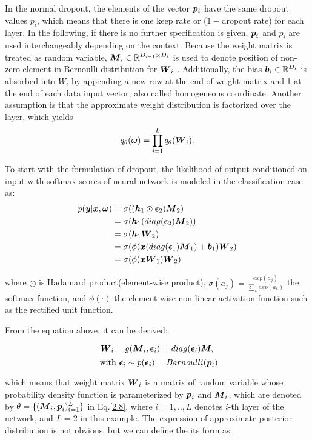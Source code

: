 In the normal dropout, the elements of the vector $\boldsymbol p_{i}$ have the same dropout values $p_{i}$, which means that there is one keep rate or ($1-$dropout rate) for each layer. In the following, if there is no further specification is given, $\boldsymbol p_{i}$ and $p_{i}$ are used interchangeably depending on the context. Because the weight matrix is treated as random variable, $\boldsymbol M_{i} \in \mathbb R^{D_{i-1} \times D_{i}}$ is used to denote position of non-zero element in Bernoulli distribution for $\boldsymbol W_{i}$ %
. Additionally, the bias $\boldsymbol b_{i} \in \mathbb R^{D_{i}}$ is absorbed into $W_{i}$ by appending a new row at the end of weight matrix and 1 at the end of each data input vector, also called homogeneous coordinate. Another assumption is that the approximate weight distribution is factorized over the layer, which yields
\[
q_{\theta}(\boldsymbol \omega) = \prod_{i=1}^{L}q_{\theta}(\boldsymbol W_{i}). 
\]

To start with the formulation of dropout, the likelihood of output conditioned on input with softmax scores of neural network is modeled in the classification case as:
\begin{equation}
\begin{aligned} \label{dropout_form}
p(\boldsymbol y| \boldsymbol x, \boldsymbol \omega) & = \sigma((\boldsymbol h_{1} \odot \boldsymbol \epsilon_{2}) \boldsymbol M_{2})\\
& = \sigma(\boldsymbol h_{1} (diag(\boldsymbol \epsilon_{2}) \boldsymbol M_{2})) \\
& = \sigma(\boldsymbol h_{1} \boldsymbol W_{2}) \\
& = \sigma(\phi(\boldsymbol x (diag(\boldsymbol \epsilon_{1}) \boldsymbol M_{1})+ \boldsymbol b_{1}) \boldsymbol W_{2}) \\
& = \sigma(\phi(\boldsymbol x \boldsymbol W_{1})\boldsymbol W_{2})
\end{aligned}
\end{equation}

where $\odot$ is Hadamard product(element-wise product), $\sigma(a_{j}) = \frac{exp({a_{j}})}{\sum_{k}exp({a_{k}})}$ 
the softmax function, and $\phi(\cdot)$ the element-wise non-linear activation function such as the rectified unit function.

From the equation above, it can be derived:

\[
\boldsymbol W_{i} = g(\boldsymbol M_{i}, \boldsymbol \epsilon_{i})= diag(\boldsymbol \epsilon_{i}) \boldsymbol M_{i} 
\]
\[ 
\text{ with } \boldsymbol \epsilon_{i} \sim p(\boldsymbol \epsilon_{i}) = Bernoulli(\boldsymbol p_{i}) 
\]

which means that weight matrix $\boldsymbol W_{i}$ is a matrix of random variable whose probability density function is parameterized by $\boldsymbol p_{i}$ and $\boldsymbol M_{i}$, which are denoted by $\theta = \{ (\boldsymbol M_{i}, \boldsymbol p_{i})_{i=1}^{L} \}$ in Eq.\ref{2.8}, where $i = {1,..,L}$ denotes $i$-th layer of the network, and $L = 2$ in this example. 
The expression of approximate posterior distribution is not obvious, but we can define the its form as 

